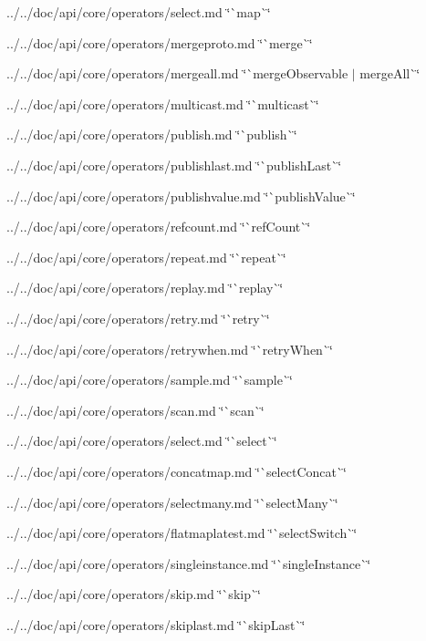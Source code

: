 \begin{DoxyItemize}
\item ../../doc/api/core/operators/select.md \char`\"{}\`{}map\`{}\char`\"{}
\item ../../doc/api/core/operators/mergeproto.md \char`\"{}\`{}merge\`{}\char`\"{}
\item ../../doc/api/core/operators/mergeall.md \char`\"{}\`{}merge\+Observable $\vert$ merge\+All\`{}\char`\"{}
\item ../../doc/api/core/operators/multicast.md \char`\"{}\`{}multicast\`{}\char`\"{}
\item ../../doc/api/core/operators/publish.md \char`\"{}\`{}publish\`{}\char`\"{}
\item ../../doc/api/core/operators/publishlast.md \char`\"{}\`{}publish\+Last\`{}\char`\"{}
\item ../../doc/api/core/operators/publishvalue.md \char`\"{}\`{}publish\+Value\`{}\char`\"{}
\item ../../doc/api/core/operators/refcount.md \char`\"{}\`{}ref\+Count\`{}\char`\"{}
\item ../../doc/api/core/operators/repeat.md \char`\"{}\`{}repeat\`{}\char`\"{}
\item ../../doc/api/core/operators/replay.md \char`\"{}\`{}replay\`{}\char`\"{}
\item ../../doc/api/core/operators/retry.md \char`\"{}\`{}retry\`{}\char`\"{}
\item ../../doc/api/core/operators/retrywhen.md \char`\"{}\`{}retry\+When\`{}\char`\"{}
\item ../../doc/api/core/operators/sample.md \char`\"{}\`{}sample\`{}\char`\"{}
\item ../../doc/api/core/operators/scan.md \char`\"{}\`{}scan\`{}\char`\"{}
\item ../../doc/api/core/operators/select.md \char`\"{}\`{}select\`{}\char`\"{}
\item ../../doc/api/core/operators/concatmap.md \char`\"{}\`{}select\+Concat\`{}\char`\"{}
\item ../../doc/api/core/operators/selectmany.md \char`\"{}\`{}select\+Many\`{}\char`\"{}
\item ../../doc/api/core/operators/flatmaplatest.md \char`\"{}\`{}select\+Switch\`{}\char`\"{}
\item ../../doc/api/core/operators/singleinstance.md \char`\"{}\`{}single\+Instance\`{}\char`\"{}
\item ../../doc/api/core/operators/skip.md \char`\"{}\`{}skip\`{}\char`\"{}
\item ../../doc/api/core/operators/skiplast.md \char`\"{}\`{}skip\+Last\`{}\char`\"{}

\end{DoxyItemize}
